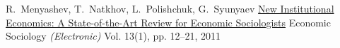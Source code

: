 \begin{cventries}
\end{cventries}



\begin{cventries}

  \cventry
    {R.~Menyashev, T.~Natkhov, L.~Polishchuk, G.~Syunyaev} %
    {\href{https://www.hse.ru/pubs/share/direct/document/59731518}{New Institutional Economics: A State-of-the-Art Review for Economic Sociologists}} %
    {Economic Sociology \emph{(Electronic)}} %
    {Vol. 13(1), pp. 12--21, 2011} %
    {
    }

\end{cventries}